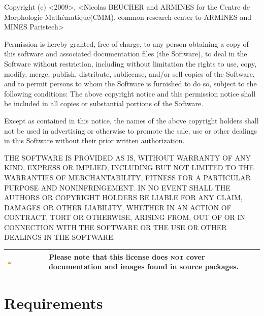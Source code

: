 \documentclass[a4paper,10pt,oneside]{article}
\newenvironment{warnBox}
{
    \begin{center}
    \begin{tabular}{ | b{0.1\textwidth} b{0.8\textwidth} | }
    \hline
    \rowcolor{yellow}
    \includegraphics[width=0.1\textwidth]{Crystal_Clear_app_error.png} &
}
{
    \\
    \hline
    \end{tabular}
    \end{center}
}
\begin{document}
\begin{minipage}[c]{0.8\textwidth}%
 {\small Copyright (c) <2009>, <Nicolas BEUCHER and ARMINES for the Centre de 
 Morphologie Math\'{e}matique(CMM), common research center to ARMINES and MINES 
 Paristech>}{\small \vspace{0.5cm} \par}

{\small Permission is hereby granted, free of charge, to any person
obtaining a copy of this software and associated documentation files
(the \textquotedbl{}Software\textquotedbl{}), to deal in the Software
without restriction, including without limitation the rights to use,
copy, modify, merge, publish, distribute, sublicense, and/or sell
copies of the Software, and to permit persons to whom the Software
is furnished to do so, subject to the following conditions: The above
copyright notice and this permission notice shall be included in all
copies or substantial portions of the Software.}{\small \vspace{0.5cm} \par}

{\small Except as contained in this notice, the names of the above copyright 
holders shall not be used in advertising or otherwise to promote the sale, use 
or other dealings in this Software without their prior written authorization.}
{\small \vspace{0.5cm} \par}

{\small THE SOFTWARE IS PROVIDED \textquotedbl{}AS IS\textquotedbl{},
WITHOUT WARRANTY OF ANY KIND, EXPRESS OR IMPLIED, INCLUDING BUT NOT
LIMITED TO THE WARRANTIES OF MERCHANTABILITY, FITNESS FOR A PARTICULAR
PURPOSE AND NONINFRINGEMENT. IN NO EVENT SHALL THE AUTHORS OR COPYRIGHT
HOLDERS BE LIABLE FOR ANY CLAIM, DAMAGES OR OTHER LIABILITY, WHETHER
IN AN ACTION OF CONTRACT, TORT OR OTHERWISE, ARISING FROM, OUT OF
OR IN CONNECTION WITH THE SOFTWARE OR THE USE OR OTHER DEALINGS IN
THE SOFTWARE. }%
\vspace{1cm}
\end{minipage}

\begin{warnBox}
Please note that this license does \textbf{\textsc{not}} cover documentation and
images found in source packages.
\end{warnBox}

\pagebreak

\section{Requirements}
\label{cha:Requirements}
\end{document}
